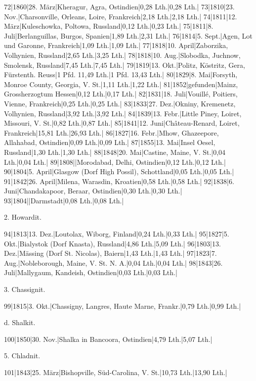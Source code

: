 \documentclass[a4paper, 11pt, oneside]{article}
\begin{document}
72|1860|28. März|Kheragur, Agra, Ostindien|0,28 Lth.|0,28 Lth.|  
73|1810|23. Nov.|Charsonville, Orleans, Loire, Frankreich|2,18 Lth.|2,18 Lth.|  
74|1811|12. März|Kuleschowka, Poltowa, Russland|0,12 Lth.|0,23 Lth.|  
75|1811|8. Juli|Berlanguillas, Burgos, Spanien|1,89 Lth.|2,31 Lth.|  
76|1814|5. Sept.|Agen, Lot und Garonne, Frankreich|1,09 Lth.|1,09 Lth.|  
77|1818|10. April|Zaborzika, Volhynien, Russland|2,65 Lth.|3,25 Lth.|  
78|1818|10. Aug.|Slobodka, Juchnow, Smolensk, Russland|7,45 Lth.|7,45 Lth.|  
79|1819|13. Okt.|Politz, Köstritz, Gera, Fürstenth. Reuss|1 Pfd. 11,49 Lth.|1 Pfd. 13,43 Lth.|  
80|1829|8. Mai|Forsyth, Monroe County, Georgia, V. St.|1,11 Lth.|1,22 Lth.|  
81|1852|gefunden|Mainz, Grossherzogtum Hessen|0,12 Lth.|0,17 Lth.|  
82|1831|18. Juli|Vouillé, Poitiers, Vienne, Frankreich|0,25 Lth.|0,25 Lth.|  
83|1833|27. Dez.|Okniny, Kremenetz, Volhynien, Russland|3,92 Lth.|3,92 Lth.|  
84|1839|13. Febr.|Little Piney, Loiret, Missouri, V. St.|0,82 Lth.|0,87 Lth.|  
85|1841|12. Juni|Château-Renard, Loiret, Frankreich|15,81 Lth.|26,93 Lth.|  
86|1827|16. Febr.|Mhow, Ghazeepore, Allahabad, Ostindien|0,09 Lth.|0,09 Lth.|  
87|1855|13. Mai|Insel Oesel, Russland|1,30 Lth.|1,30 Lth.|  
88|1848|20. Mai|Castine, Maine, V. St.|0,04 Lth.|0,04 Lth.|  
89|1808||Morodabad, Delhi, Ostindien|0,12 Lth.|0,12 Lth.|  
90|1804|5. April|Glasgow (Dorf High Possil), Schottland|0,05 Lth.|0,05 Lth.|  
91|1842|26. April|Milena, Warasdin, Kroatien|0,58 Lth.|0,58 Lth.|  
92|1838|6. Juni|Chandakapoor, Beraar, Ostindien|0,30 Lth.|0,30 Lth.|  
93|1804||Darmstadt|0,08 Lth.|0,08 Lth.|  

2. Howardit.

94|1813|13. Dez.|Loutolax, Wiborg, Finland|0,24 Lth.|0,33 Lth.|  
95|1827|5. Okt.|Bialystok (Dorf Knasta), Russland|4,86 Lth.|5,09 Lth.|  
96|1803|13. Dez.|Mässing (Dorf St. Nicolas), Baiern|1,43 Lth.|1,43 Lth.|  
97|1823|7. Aug.|Nobleborough, Maine, V. St. N. A.|0,04 Lth.|0,04 Lth.|  
98|1843|26. Juli|Mallygaum, Kandeish, Ostindien|0,03 Lth.|0,03 Lth.|  

3. Chassignit.  

99|1815|3. Okt.|Chassigny, Langres, Haute Marne, Frankr.|0,79 Lth.|0,99 Lth.|  

d. Shalkit.  

100|1850|30. Nov.|Shalka in Bancoora, Ostindien|4,79 Lth.|5,07 Lth.|  

5. Chladnit.  

101|1843|25. März|Bishopville, Süd-Carolina, V. St.|10,73 Lth.|13,90 Lth.|  
\end{document}
